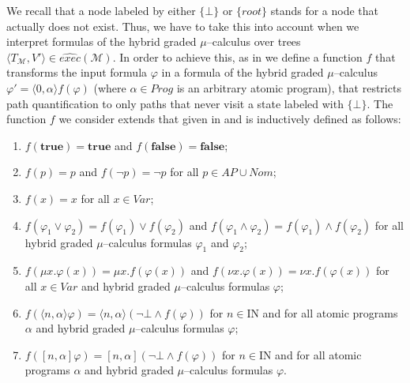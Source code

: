 \documentclass{LMCS}
\theoremstyle{plain}
\def \aa            {\alpha}
\def \false         {\mathbf{false}}
\def \M             {\mathcal{M}}
\def \Naturals      {\mbox{I$\!$N}}
\def \rr            {\mathit{root}}
\def \true          {\mathbf{true}}
\newcommand \tpl[1] {\langle #1 \rangle}
\begin{document}
We recall that a node labeled by either $\{\bot\}$ or $\{\rr\}$
stands for a node that actually does not exist. Thus, we have to
take this into account when we interpret formulas of the hybrid
graded $\mu$--calculus over trees $\tpl{T_{\M},V'} \in
\widehat{exec}(\M)$. In order to achieve this, as in \cite{KVW01}
we define a function $f$ that transforms the input formula
$\varphi$ in a formula of the hybrid graded $\mu$--calculus
$\varphi'= \tpl{0,\alpha}f(\varphi)$ (where $\alpha \in Prog$ is
an arbitrary atomic program), that restricts path quantification
to only paths that never visit a state labeled with $\{\bot\}$.
The function $f$ we consider extends that given in \cite{KVW01}
and is inductively defined as follows:
\begin{enumerate}[$\bullet$]
\item
$f(\true) = \true$ and $f(\false) = \false$;

\item
$f(p) = p$ and $f(\neg p) = \neg p$ for all $p \in AP \cup Nom$;

\item
$f(x) = x$ for all $x \in Var$;

\item
$f(\varphi_1 \vee \varphi_2) = f(\varphi_1) \vee f(\varphi_2)$ and
$f(\varphi_1 \wedge \varphi_2) = f(\varphi_1) \wedge f(\varphi_2)$
for all hybrid graded $\mu$--calculus formulas $\varphi_1$ and
$\varphi_2$;

\item
$f(\mu x.\varphi(x))= \mu x. f(\varphi(x))$ and $f(\nu x.
\varphi(x))= \nu x. f(\varphi(x))$ for all $x \in Var$ and hybrid
graded $\mu$--calculus formulas $\varphi$;

\item
$f(\tpl{n,\aa}\varphi) = \tpl{n,\aa}(\neg \bot \wedge f(\varphi))$
for $n \in \Naturals$ and for all atomic programs $\aa$ and hybrid
graded $\mu$--calculus formulas $\varphi$;

\item
$f([n,\aa]\varphi) = [n,\aa](\neg \bot \wedge f(\varphi))$ for $n
\in \Naturals$ and for all atomic programs $\aa$ and hybrid graded
$\mu$--calculus formulas $\varphi$.
\end{enumerate}
\end{document}
